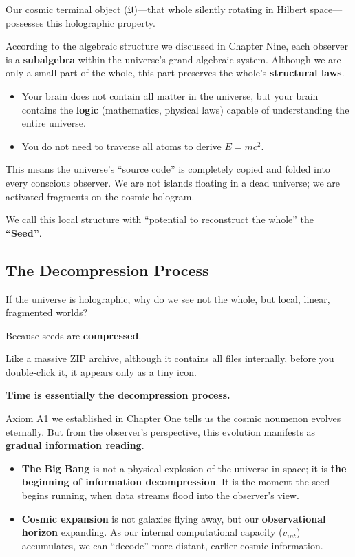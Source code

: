 \documentclass[11pt,a4paper,twoside]{book}
\begin{document}
Our cosmic terminal object ($\mathfrak U$)---that whole silently rotating in Hilbert space---possesses this holographic property.

According to the algebraic structure we discussed in Chapter Nine, each observer is a \textbf{subalgebra} within the universe's grand algebraic system. Although we are only a small part of the whole, this part preserves the whole's \textbf{structural laws}.

\begin{itemize}
\item Your brain does not contain all matter in the universe, but your brain contains the \textbf{logic} (mathematics, physical laws) capable of understanding the entire universe.

\item You do not need to traverse all atoms to derive $E=mc^2$.
\end{itemize}

This means the universe's ``source code'' is completely copied and folded into every conscious observer. We are not islands floating in a dead universe; we are activated fragments on the cosmic hologram.

We call this local structure with ``potential to reconstruct the whole'' the \textbf{``Seed''}.

\subsection{The Decompression Process}

If the universe is holographic, why do we see not the whole, but local, linear, fragmented worlds?

Because seeds are \textbf{compressed}.

Like a massive ZIP archive, although it contains all files internally, before you double-click it, it appears only as a tiny icon.

\textbf{Time is essentially the decompression process.}

Axiom A1 we established in Chapter One tells us the cosmic noumenon evolves eternally. But from the observer's perspective, this evolution manifests as \textbf{gradual information reading}.

\begin{itemize}
\item \textbf{The Big Bang} is not a physical explosion of the universe in space; it is \textbf{the beginning of information decompression}. It is the moment the seed begins running, when data streams flood into the observer's view.

\item \textbf{Cosmic expansion} is not galaxies flying away, but our \textbf{observational horizon} expanding. As our internal computational capacity ($v_{int}$) accumulates, we can ``decode'' more distant, earlier cosmic information.
\end{itemize}
\end{document}
